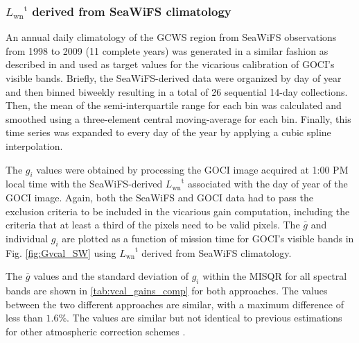 \documentclass[]{interact}
\theoremstyle{plain}%
\theoremstyle{definition}
\theoremstyle{remark}
\begin{document}
\subsubsection{${L_\text{wn}}^\text{t}$ derived from SeaWiFS climatology}
An annual daily climatology of the GCWS region from SeaWiFS observations from 1998 to 2009 (11 complete years) was generated in a similar fashion as described in \cite{Werdell:07} and used as target values for the vicarious calibration of GOCI's visible bands. Briefly, the SeaWiFS-derived data were organized by day of year and then binned biweekly resulting in a total of 26 sequential 14-day collections. Then, the mean of the semi-interquartile range for each bin was calculated and smoothed using a three-element central moving-average for each bin. Finally, this time series was expanded to every day of the year by applying a cubic spline interpolation. 

The $g_i$ values were obtained by processing the GOCI image acquired at 1:00 PM local time with the SeaWiFS-derived ${L_\text{wn}}^\text{t}$ associated with the day of year of the GOCI image. Again, both the SeaWiFS and GOCI data had to pass the exclusion criteria to be included in the vicarious gain computation, including the criteria that at least a third of the pixels need to be valid pixels. The $\bar{g}$ and individual $g_i$ are plotted as a function of mission time for GOCI's visible bands in Fig. \ref{fig:Gvcal_SW} using ${L_\text{wn}}^\text{t}$ derived from SeaWiFS climatology.

The $\bar{g}$ values and the standard deviation of $g_i$ within the MISQR for all spectral bands are shown in \autoref{tab:vcal_gains_comp} for both approaches. The values between the two different approaches are similar, with a maximum difference of less than $1.6\%$. The values are similar but not identical to previous estimations for other atmospheric correction schemes \citep{Wang:13,Ahn2015}. 
\end{document}
